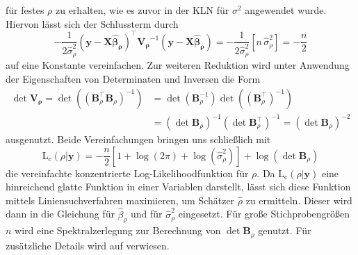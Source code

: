 für festes $\rho$ zu erhalten, wie es zuvor in der KLN für $\sigma^2$ angewendet wurde. Hiervon lässt sich der Schlussterm durch
\begin{equation*}
    -\frac{1}{2 \hat{\sigma}_{\rho}^{2}} \left( \mathbf{y-X \hat{\beta}_{\rho}} \right)^{\top} \mathbf{V_{\rho}}^{-1} \left( \mathbf{y-X \hat{\beta}_{\rho}} \right)
    = -\frac{1}{2 \hat{\sigma}_{\rho}^{2}} \left[ n \, \hat{\sigma}_{\rho}^{2} \right] = -\frac{n}{2}
\end{equation*}
auf eine Konstante vereinfachen. Zur weiteren Reduktion wird unter Anwendung der Eigenschaften 
von Determinaten und Inversen die Form
\begin{align*}
    \det \mathbf{V_{\rho}} = \det \left(  \left(\mathbf{B}_{\rho}^{\top} \mathbf{B}_{\rho} \right)^{-1} \right) 
    & = \det \left(\mathbf{B}_{\rho}^{-1} \right)  \det \left(\left( \mathbf{B}_{\rho}^{\top} \right)^{-1} \right) \\
    & = \left( \det \mathbf{B}_{\rho} \right)^{-1}  \left( \det \mathbf{B}_{\rho}^{\top} \right)^{-1} 
    = \left( \det \mathbf{B}_{\rho} \right)^{-2}
\end{align*}
ausgenutzt. Beide Vereinfachungen bringen uns schließlich mit
\begin{equation*}
    \operatorname{L_{c}}(\rho|\mathbf{y})= -\frac{n}{2} \left[ 1+ \log(2\pi)+ \log(\hat{\sigma}_{\rho}^{2}) \right] 
    + \log(\det \mathbf{B}_{\rho} )
\end{equation*}
die vereinfachte konzentrierte Log-Likelihoodfunktion für $\rho$. 
Da $\operatorname{L_{c}}(\rho|\mathbf{y})$ eine 
hinreichend glatte Funktion in einer Variablen darstellt, lässt sich diese Funktion 
mittels Liniensuchverfahren maximieren, um Schätzer $\hat{\rho}$ zu ermitteln. Dieser wird dann in die 
Gleichung für $\hat{\beta}_{\rho}$ und für $\hat{\sigma}_{\rho}^{2}$ eingesetzt. Für 
große Stichprobengrößen $n$ wird eine Spektralzerlegung zur Berechnung von $\det \mathbf{B}_{\rho}$ genutzt. \cite[S. 300]{bivand_applied_2013}
Für zusätzliche Details wird auf \cite[S.440]{cressie_statistics_1993} verwiesen.



 